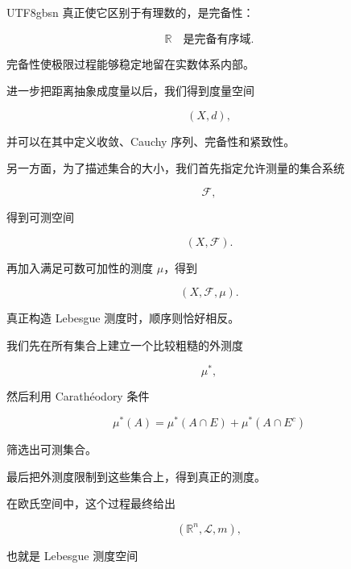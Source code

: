 \documentclass[11pt]{article}
\begin{document}
\begin{CJK*}{UTF8}{gbsn}
真正使它区别于有理数的，是完备性：

\[
\mathbb{R}\quad\text{是完备有序域}.
\]

完备性使极限过程能够稳定地留在实数体系内部。

进一步把距离抽象成度量以后，我们得到度量空间

\[
(X,d),
\]

并可以在其中定义收敛、Cauchy 序列、完备性和紧致性。

另一方面，为了描述集合的大小，我们首先指定允许测量的集合系统

\[
\mathcal{F},
\]

得到可测空间

\[
(X,\mathcal{F}).
\]

再加入满足可数可加性的测度 $\mu$，得到

\[
(X,\mathcal{F},\mu).
\]

真正构造 Lebesgue 测度时，顺序则恰好相反。

我们先在所有集合上建立一个比较粗糙的外测度

\[
\mu^{*},
\]

然后利用 Carathéodory 条件

\[
\mu^{*}(A)=\mu^{*}(A\cap E)+\mu^{*}(A\cap E^{c})
\]

筛选出可测集合。

最后把外测度限制到这些集合上，得到真正的测度。

在欧氏空间中，这个过程最终给出

\[
(\mathbb{R}^{n},\mathcal{L},m),
\]

也就是 Lebesgue 测度空间

\end{CJK*}
\end{document}
